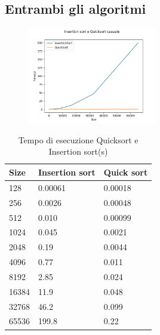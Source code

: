 \documentclass[]{article}
\begin{document}
\subsection{Entrambi gli algoritmi}
\begin{figure}[H]
\centering
	\includegraphics[width=0.5\textwidth]{InsertionSortEQuicksortCasuale}
	\label{fig:insertion_quick}
\end{figure}

\begin{table}[H]
\caption{Tempo di esecuzione Quicksort e Insertion sort(s)}
\label{tab:insertion_quick}
\centering
\begin{tabular}{|l|l|l|} 
\hline
Size  & Insertion sort & Quick sort  \\ 
\hline
128   & 0.00061        & 0.00018     \\
256   & 0.0026         & 0.00048     \\
512   & 0.010          & 0.00099     \\
1024  & 0.045          & 0.0021      \\
2048  & 0.19           & 0.0044      \\
4096  & 0.77           & 0.011       \\
8192  & 2.85           & 0.024       \\
16384 & 11.9           & 0.048       \\
32768 & 46.2           & 0.099       \\
65536 & 199.8          & 0.22        \\
\hline
\end{tabular}
\end{table}
\end{document}

